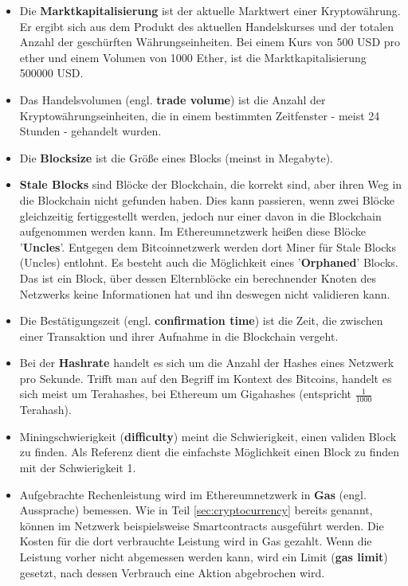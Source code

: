 \begin{itemize}
\item Die \textbf{Marktkapitalisierung} ist der aktuelle Marktwert einer Kryptowährung. Er ergibt sich aus dem Produkt des aktuellen Handelskurses und der totalen Anzahl der geschürften Währungseinheiten. Bei einem Kurs von 500 USD pro \gls{ether} und einem Volumen von 1000 Ether, ist die Marktkapitalisierung 500000 USD.
\item Das Handelsvolumen (engl. \textbf{trade volume}) ist die Anzahl der Kryptowährungseinheiten, die in einem bestimmten Zeitfenster - meist 24 Stunden - gehandelt wurden.
\item Die \textbf{Blocksize} ist die Größe eines Blocks (meinst in Megabyte).
\item \textbf{Stale Blocks} sind Blöcke der Blockchain, die korrekt sind, aber ihren Weg in die Blockchain nicht gefunden haben. Dies kann passieren, wenn zwei Blöcke gleichzeitig fertiggestellt werden, jedoch nur einer davon in die Blockchain aufgenommen werden kann.\citep{bitcoinproject_stale_2017} Im Ethereumnetzwerk heißen diese Blöcke '\textbf{Uncles}'. Entgegen dem Bitcoinnetzwerk werden dort Miner für Stale Blocks (Uncles) entlohnt.\citep{jdebunt_what_2017} Es besteht auch die Möglichkeit eines '\textbf{Orphaned}' Blocks. Das ist ein Block, über dessen Elternblöcke ein berechnender Knoten des Netzwerks keine Informationen hat und ihn deswegen nicht validieren kann.\citep{bitcoinproject_orphan_2017}
\item Die Bestätigungszeit (engl. \textbf{confirmation time}) ist die Zeit, die zwischen einer Transaktion und ihrer Aufnahme in die Blockchain vergeht.\citep{kumar_cryptocurrency_2017}
\item Bei der \textbf{Hashrate} handelt es sich um die Anzahl der Hashes eines Netzwerk pro Sekunde. Trifft man auf den Begriff im Kontext des Bitcoins, handelt es sich meist um Terahashes, bei Ethereum um Gigahashes (entspricht $ \frac{1}{1000}$ Terahash).\citep{kumar_cryptocurrency_2017}
\item Miningschwierigkeit (\textbf{difficulty}) meint die Schwierigkeit, einen validen Block zu finden. Als Referenz dient die einfachste Möglichkeit einen Block zu finden mit der Schwierigkeit 1.\citep{bitcoinproject_difficulty_2017}
\item Aufgebrachte Rechenleistung wird im Ethereumnetzwerk in \textbf{Gas} (engl. Aussprache) bemessen. Wie in Teil \ref{sec:cryptocurrency} bereits genannt, können im Netzwerk beispielsweise Smartcontracts ausgeführt werden. Die Kosten für die dort verbrauchte Leistung wird in Gas gezahlt. Wenn die Leistung vorher nicht abgemessen werden kann, wird ein Limit (\textbf{gas limit}) gesetzt, nach dessen Verbrauch eine Aktion abgebrochen wird.\citep[S.~4]{wood_ethereum:_2014}
\end{itemize}

